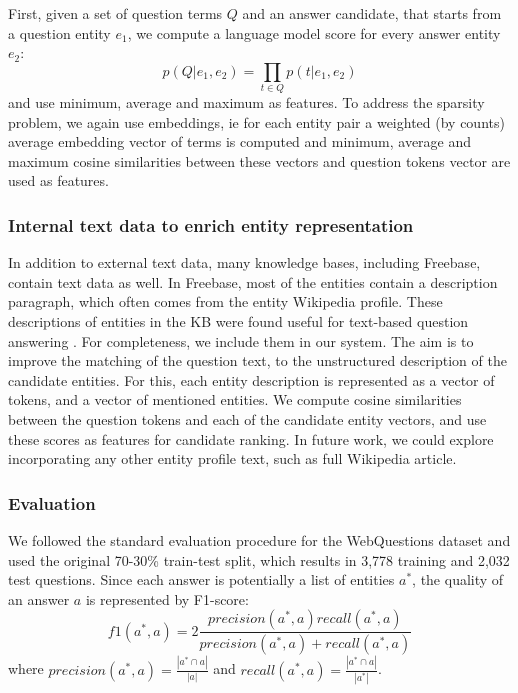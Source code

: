 First, given a set of question terms $Q$ and an answer candidate, that starts from a question entity $e_1$, we compute a language model score for every answer entity $e_2$:
$$p(Q|e_1, e_2) = \prod_{t\in Q} p(t | e_1, e_2)$$
and use minimum, average and maximum as features.
To address the sparsity problem, we again use embeddings, 
ie for each entity pair a weighted (by counts) average embedding vector of terms is computed and minimum, average and maximum cosine similarities between these vectors and question tokens vector are used as features.

\subsubsection{Internal text data to enrich entity representation}
\label{subsubsec:text2kb:internal_text}

In addition to external text data, many knowledge bases, including Freebase, contain text data as well.
In Freebase, most of the entities contain a description paragraph, which often comes from the entity Wikipedia profile.
These descriptions of entities in the KB were found useful for text-based question answering \cite{Sun:2015:ODQ:2736277.2741651}.
For completeness, we include them in our system. The aim is to improve the matching of the question text, to the unstructured description of the candidate entities. For this, each entity description is represented as a vector of tokens, and a vector of mentioned entities. We compute cosine similarities between the question tokens and each of the candidate entity vectors, and use these scores as features for candidate ranking.
In future work, we could explore incorporating any other entity profile text, such as full Wikipedia article.


\subsubsection{Evaluation}
\label{subsubsec:text2kb:evaluation}

We followed the standard evaluation procedure for the WebQuestions dataset and used the original 70-30\% train-test split, which results in 3,778 training and 2,032 test questions.
Since each answer is potentially a list of entities $a^*$, the quality of an answer $a$ is represented by F1-score: 
$$f1(a^*, a) = 2\frac{precision(a^*,a) recall(a^*,a)}{precision(a^*,a) + recall(a^*,a)}$$
where $precision(a^*, a)=\frac{|a^* \cap a|}{|a|}$ and $recall(a^*, a) = \frac{|a^* \cap a|}{|a^*|}$.

